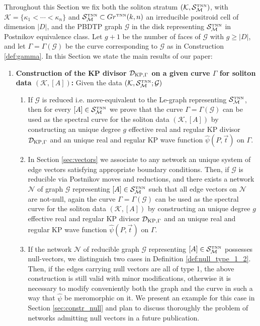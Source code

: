 \documentclass[11pt]{amsart}
\theoremstyle{plain}
\numberwithin{equation}{section}
\def \GTNN {{Gr^{\mbox{\tiny TNN}} (k,n)}}
\def \DKP {{\mathcal D}_{\textup{\scriptsize KP},\Gamma}}
\def \S {{\mathcal S}_{\mathcal M}^{\mbox{\tiny TNN}}}
\begin{document}
Throughout this Section we fix both the soliton stratum $({\mathcal K}, \S)$, with ${\mathcal K} =\{ \kappa_1 < \cdots <\kappa_n\}$ and $\S \subset \GTNN$ an irreducible positroid cell of dimension $|D|$, and the PBDTP graph ${\mathcal G}$ in the disk representing $\S$ in Postnikov equivalence class. Let $g+1$ be the number of faces of $\mathcal G$ with $g\ge |D|$, and let $\Gamma=\Gamma(\mathcal G)$ be the curve corresponding to $\mathcal G$ as in Construction \ref{def:gamma}. 
In this Section we state the main results of our paper: 
\begin{enumerate}
\item \textbf{Construction of the KP divisor $\DKP$ on a given curve $\Gamma$ for soliton data $(\mathcal K, [A])$:}
Given the data $({\mathcal K}, \S;{\mathcal G})$
\begin{enumerate}
\item If ${\mathcal G}$ is reduced i.e. move-equivalent to the Le-graph representing $\S$, then for every $[A] \in \S$ we prove that the curve $\Gamma=\Gamma(\mathcal G)$ can be used as the spectral curve for the soliton data $(\mathcal K, [A])$ by constructing an unique degree $g$ effective real and regular KP divisor $\DKP$ and an unique real and regular KP wave function $\hat \psi(P,\vec t)$ on $\Gamma$.
\item In Section \ref{sec:vectors} we associate to any network an unique system of edge vectors satisfying appropriate boundary conditions. Then, if ${\mathcal G}$ is reducible via Postnikov moves and reductions, and there exists a network $\mathcal N$ of graph ${\mathcal G}$ representing $[A] \in \S$ such that all edge vectors on $\mathcal N$ are not-null, again the curve $\Gamma=\Gamma(\mathcal G)$ can be used as the spectral curve for the soliton data $(\mathcal K, [A])$ by constructing an unique degree $g$ effective real and regular KP divisor $\DKP$ and an unique real and regular KP wave function $\hat \psi(P,\vec t)$ on $\Gamma$.
\item If the network $\mathcal N$ of reducible graph ${\mathcal G}$ representing $[A] \in \S$ possesses null-vectors, we  distinguish two cases in Definition \ref{def:null_type_1_2}. Then, if the edges carrying null vectors are all of type 1, the above construction is still valid with minor modifications, otherwise it is necessary to modify conveniently both the graph and the curve in such a way that $\hat \psi$ be meromorphic on it. We present an example for this case in Section \ref{sec:constr_null} and plan to discuss thoroughly the problem of networks admitting null vectors in a future publication.

\end{enumerate}
\end{enumerate}
\end{document}
